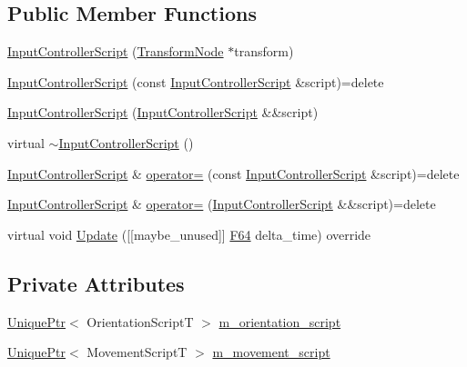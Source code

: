 \subsection*{Public Member Functions}
\begin{DoxyCompactItemize}
\item 
\hyperlink{classmage_1_1script_1_1_input_controller_script_a15356387b73371d6edf546e18842547a}{Input\+Controller\+Script} (\hyperlink{classmage_1_1_transform_node}{Transform\+Node} $\ast$transform)
\item 
\hyperlink{classmage_1_1script_1_1_input_controller_script_a42c6603b4c040e9b8fe62ca67023cb43}{Input\+Controller\+Script} (const \hyperlink{classmage_1_1script_1_1_input_controller_script}{Input\+Controller\+Script} \&script)=delete
\item 
\hyperlink{classmage_1_1script_1_1_input_controller_script_a3726d5057dbdbc6193e3879951717255}{Input\+Controller\+Script} (\hyperlink{classmage_1_1script_1_1_input_controller_script}{Input\+Controller\+Script} \&\&script)
\item 
virtual \hyperlink{classmage_1_1script_1_1_input_controller_script_ae68fc8ff7d4527a9524c405f94c0e744}{$\sim$\+Input\+Controller\+Script} ()
\item 
\hyperlink{classmage_1_1script_1_1_input_controller_script}{Input\+Controller\+Script} \& \hyperlink{classmage_1_1script_1_1_input_controller_script_a76bc93d06f25540e2002d1a491fd10e6}{operator=} (const \hyperlink{classmage_1_1script_1_1_input_controller_script}{Input\+Controller\+Script} \&script)=delete
\item 
\hyperlink{classmage_1_1script_1_1_input_controller_script}{Input\+Controller\+Script} \& \hyperlink{classmage_1_1script_1_1_input_controller_script_a4d13e3a38c42780f31e955128681d6d0}{operator=} (\hyperlink{classmage_1_1script_1_1_input_controller_script}{Input\+Controller\+Script} \&\&script)=delete
\item 
virtual void \hyperlink{classmage_1_1script_1_1_input_controller_script_ab013f70add87cec139fd72bb24af5846}{Update} (\mbox{[}\mbox{[}maybe\+\_\+unused\mbox{]}\mbox{]} \hyperlink{namespacemage_ad26233bbec640deda836e572c1a23708}{F64} delta\+\_\+time) override
\end{DoxyCompactItemize}
\subsection*{Private Attributes}
\begin{DoxyCompactItemize}
\item 
\hyperlink{namespacemage_a3316d7143a973e37adf1110f2e80ca31}{Unique\+Ptr}$<$ Orientation\+ScriptT $>$ \hyperlink{classmage_1_1script_1_1_input_controller_script_a74df197b5683c4aba93d1c5791b03de7}{m\+\_\+orientation\+\_\+script}
\item 
\hyperlink{namespacemage_a3316d7143a973e37adf1110f2e80ca31}{Unique\+Ptr}$<$ Movement\+ScriptT $>$ \hyperlink{classmage_1_1script_1_1_input_controller_script_a72ff512de7a05d89d747fcbfc3c1ddc9}{m\+\_\+movement\+\_\+script}
\end{DoxyCompactItemize}
